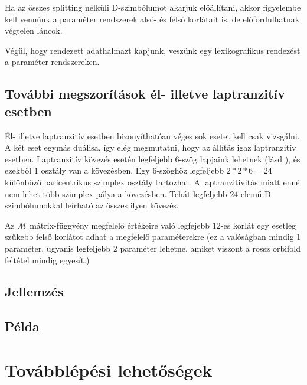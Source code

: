 \documentclass[12pt,magyar,a4paper]{article}
\begin{document}
Ha az összes splitting nélküli D-szimbólumot akarjuk előállítani, akkor
figyelembe kell vennünk a paraméter rendszerek alsó- és felső korlátait is, de
előfordulhatnak végtelen láncok.

Végül, hogy rendezett adathalmazt kapjunk, veszünk egy lexikografikus rendezést
a paraméter rendszereken.
\subsection{További megszorítások él- illetve laptranzitív esetben}
Él- illetve laptranzitív esetben bizonyíthatóan véges sok esetet kell csak
vizsgálni. A két eset egymás duálisa, így elég megmutatni, hogy az állítás igaz
laptranzitív esetben. Laptranzitív kövezés esetén legfeljebb $6$-szög lapjaink
lehetnek (lásd \cite{xy}), és ezekből $1$ osztály van a kövezésben. Egy
$6$-szöghöz legfeljebb $2*2*6=24$ különböző baricentrikus szimplex osztály
tartozhat. A laptranzitivitás miatt ennél nem lehet több szimplex-pálya a
kövezésben. Tehát legfeljebb $24$ elemű D-szimbólumokkal leírható az összes
ilyen kövezés.

Az $\mathcal{M}$ mátrix-függvény megfelelő értékeire való legfejebb 12-es korlát
egy esetleg szűkebb felső korlátot adhat a megfelelő paraméterekre (ez a
valóságban mindig $1$ paraméter, ugyanis legfeljebb $2$ paraméter lehetne,
amiket viszont a rossz orbifold feltétel mindig egyesít.)

\subsection{Jellemzés}
\subsection{Példa}

\section{Továbblépési lehetőségek}

\nocite{DHM93,D87,Du88,H93,LM90,Ma67,M94,T82,VS93,F94,F03}


\end{document}
